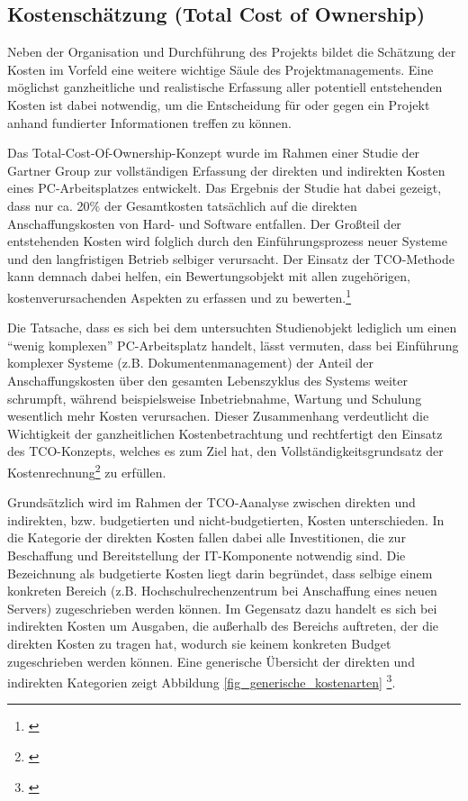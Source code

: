 \subsection{Kostenschätzung (Total Cost of Ownership)}
\label{subsection_kostenschatzung_TCO}
Neben der Organisation und Durchführung des Projekts bildet die Schätzung der Kosten im Vorfeld eine weitere wichtige Säule des Projektmanagements. Eine möglichst ganzheitliche und realistische Erfassung aller potentiell entstehenden Kosten ist dabei notwendig, um die Entscheidung für oder gegen ein Projekt anhand fundierter Informationen treffen zu können.

Das Total-Cost-Of-Ownership-Konzept wurde im Rahmen einer Studie der Gartner Group zur vollständigen Erfassung der direkten und indirekten Kosten eines PC-Arbeitsplatzes entwickelt. Das Ergebnis der Studie hat dabei gezeigt, dass nur ca. 20\% der Gesamtkosten tatsächlich auf die direkten Anschaffungskosten von Hard- und Software entfallen. Der Großteil der entstehenden Kosten wird folglich durch den Einführungsprozess neuer Systeme und den langfristigen Betrieb selbiger verursacht. Der Einsatz der TCO-Methode kann demnach dabei helfen, ein Bewertungsobjekt mit allen zugehörigen, kostenverursachenden Aspekten zu erfassen und zu bewerten.\footnote{\cite{hansen_business_2009}}

Die Tatsache, dass es sich bei dem untersuchten Studienobjekt lediglich um einen “wenig komplexen” PC-Arbeitsplatz handelt, lässt vermuten, dass bei Einführung komplexer Systeme (z.B. Dokumentenmanagement) der Anteil der Anschaffungskosten über den gesamten Lebenszyklus des Systems weiter schrumpft, während beispielsweise Inbetriebnahme, Wartung und Schulung wesentlich mehr Kosten verursachen. Dieser Zusammenhang verdeutlicht die Wichtigkeit der ganzheitlichen Kostenbetrachtung und rechtfertigt den Einsatz des TCO-Konzepts, welches es zum Ziel hat, den Vollständigkeitsgrundsatz der Kostenrechnung\footnote{\cite{grob_einfuhrung_2004}} zu erfüllen.

Grundsätzlich wird im Rahmen der TCO-Aanalyse zwischen direkten und indirekten, bzw. budgetierten und nicht-budgetierten, Kosten unterschieden. In die Kategorie der direkten Kosten fallen dabei alle Investitionen, die zur Beschaffung und Bereitstellung der IT-Komponente notwendig sind. Die Bezeichnung als budgetierte Kosten liegt darin begründet, dass selbige einem konkreten Bereich (z.B. Hochschulrechenzentrum bei Anschaffung eines neuen Servers) zugeschrieben werden können. Im Gegensatz dazu handelt es sich bei indirekten Kosten um Ausgaben, die außerhalb des Bereichs auftreten, der die direkten Kosten zu tragen hat, wodurch sie keinem konkreten Budget zugeschrieben werden können. Eine generische Übersicht der direkten und indirekten Kategorien zeigt Abbildung \ref{fig_generische_kostenarten} \footnote{\cite{hansen_business_2009}}.

